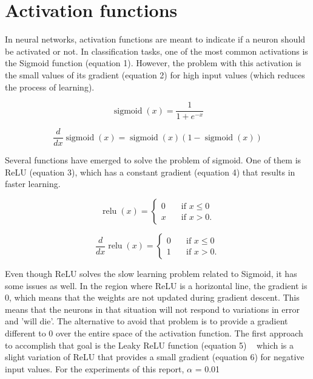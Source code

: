 \documentclass{article}
\DeclareMathOperator{\sigmoid}{sigmoid}
\DeclareMathOperator{\relu}{relu}
\begin{document}
\section{Activation functions}
\label{sec:actfn}
In neural networks, activation functions are meant to indicate if a neuron should be activated or not. In classification tasks, one of the most common activations is the Sigmoid function (equation 1). However, the problem with this activation is the small values of its gradient (equation 2) for high input values (which reduces the process of learning).

\begin{equation}
  \sigmoid(x) = \frac{1}{1 + e^{-x}}
\end{equation} 

\begin{equation}
  \frac{d}{dx} \sigmoid(x) = \sigmoid(x)(1 - \sigmoid(x))
\end{equation} 


Several functions have emerged to solve the problem of sigmoid. One of them is ReLU (equation 3), which has a constant gradient (equation 4) that results in faster learning.

\begin{equation}
  \relu(x) =
     \begin{cases} 
      0      & \quad \text{if } x \leq  0 \\
      x       & \quad \text{if } x > 0 .
    \end{cases} 
\end{equation}

\begin{equation}
  \frac{d}{dx} \relu(x) =
     \begin{cases} 
      0      & \quad \text{if } x \leq  0 \\
      1       & \quad \text{if } x > 0 .
    \end{cases} 
\end{equation}

Even though ReLU solves the slow learning problem related to Sigmoid, it has some issues as well. In the region where ReLU is a horizontal line, the gradient is 0, which means that the weights are not updated during gradient descent. This means that the neurons in that situation will not respond to variations in error and 'will die'. The alternative to avoid that problem is to provide a gradient different to 0 over the entire space of the activation function. The first approach to accomplish that goal is the Leaky ReLU function (equation 5) ~\citep{act_lrelu} which is a slight variation of ReLU that provides a small gradient (equation 6) for negative input values. For the experiments of this report, \(\alpha\) = 0.01
\end{document}
